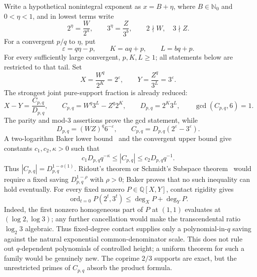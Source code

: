 \documentclass[11pt,oneside]{article}
\theoremstyle{definition}
\theoremstyle{remark}
\newcommand{\Nzero}{\mathbb N_0}
\newcommand{\Q}{\mathbb Q}
\begin{document}
Write a hypothetical nonintegral exponent as $x=B+\eta$, where $B\in\Nzero$ and
$0<\eta<1$, and in lowest terms write
\[
 2^\eta=\frac{W}{2^a},\qquad 3^\eta=\frac{Z}{3^b},
 \qquad 2\nmid W,\quad 3\nmid Z.
\]
For a convergent $p/q$ to $\eta$, put
\[
 \varepsilon=q\eta-p,\qquad K=aq+p,\qquad L=bq+p.
\]
For every sufficiently large convergent, $p,K,L\ge1$; all statements below are restricted to
that tail.  Set
\[
 X=\frac{W^q}{2^K}=2^\varepsilon,\qquad
 Y=\frac{Z^q}{3^L}=3^\varepsilon.
\]
The strongest joint pure-support fraction is already reduced:
\begin{equation}
 X-Y=\frac{C_{p,q}}{D_{p,q}},\qquad
 C_{p,q}=W^q3^L-Z^q2^K,\qquad D_{p,q}=2^K3^L,\qquad
 \gcd(C_{p,q},6)=1.
 \label{crit:eq-pure-cross}
\end{equation}
The parity and mod-$3$ assertions prove the gcd statement, while
\begin{equation}
 D_{p,q}=(WZ)^q6^{-\varepsilon},\qquad
 C_{p,q}=D_{p,q}(2^\varepsilon-3^\varepsilon).
 \label{crit:eq-pure-height}
\end{equation}
A two-logarithm Baker lower bound~\cite{Baker1975} and the convergent upper bound give constants
$c_1,c_2,\kappa>0$ such that
\begin{equation}
 c_1D_{p,q}q^{-\kappa}\le |C_{p,q}|\le c_2D_{p,q}q^{-1}.
 \label{crit:eq-pure-barrier}
\end{equation}
Thus $|C_{p,q}|=D_{p,q}^{1-o(1)}$.  Ridout's theorem or Schmidt's Subspace
theorem~\cite{Ridout1958,Schmidt1980} would require a
fixed saving $D_{p,q}^{1-\rho}$ with $\rho>0$; Baker proves that no such inequality can
hold eventually.  For every fixed nonzero $P\in\Q[X,Y]$, contact rigidity gives
\[
 \operatorname{ord}_{t=0}P(2^t,3^t)
 \le \deg_XP+\deg_YP.
\]
Indeed, the first nonzero homogeneous part of $P$ at $(1,1)$ evaluates at
$(\log2,\log3)$; any further cancellation would make the transcendental ratio
$\log_2 3$ algebraic.
Thus fixed-degree contact supplies only a polynomial-in-$q$ saving against the natural
exponential common-denominator scale.  This does not rule out $q$-dependent polynomials of
controlled height; a uniform theorem for such a family would be genuinely new.  The coprime
$2/3$ supports are exact, but the unrestricted primes of $C_{p,q}$ absorb the product formula.
\end{document}
